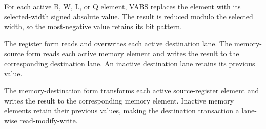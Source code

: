 For each active B, W, L, or Q element, VABS replaces the element with its
selected-width signed absolute value. The result is reduced modulo the selected
width, so the most-negative value retains its bit pattern.

The register form reads and overwrites each active destination lane. The
memory-source form reads each active memory element and writes the result to the
corresponding destination lane. An inactive destination lane retains its
previous value.

The memory-destination form transforms each active source-register element and
writes the result to the corresponding memory element. Inactive memory elements
retain their previous values, making the destination transaction a lane-wise
read-modify-write.
